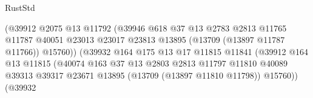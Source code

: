 \begin{lexlean}{RustStd}
\begin{coremodule}
                                              (@39912
                                                @2075
                                                @13
                                                @11792
                                                (@39946
                                                  @618
                                                  @37
                                                  @13
                                                  @2783
                                                  @2813
                                                  @11765
                                                  @11787
                                                  @40051
                                                  @23013
                                                  @23017
                                                  @23813
                                                  @13895
                                                  (@13709 (@13897 @11787 @11766))
                                                  @15760))
                                              (@39932
                                                @164
                                                @175
                                                @13
                                                @17
                                                @11815
                                                @11841
                                                (@39912
                                                  @164
                                                  @13
                                                  @11815
                                                  (@40074
                                                    @163
                                                    @37
                                                    @13
                                                    @2803
                                                    @2813
                                                    @11797
                                                    @11810
                                                    @40089
                                                    @39313
                                                    @39317
                                                    @23671
                                                    @13895
                                                    (@13709 (@13897 @11810 @11798))
                                                    @15760))
                                                (@39932

\end{coremodule}
\end{lexlean}
